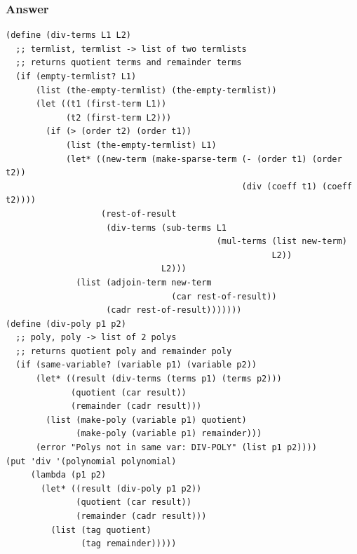 \documentclass[final,fleqn,titlepage,twoside]{article}
\begin{document}
\subsubsection{Answer}
\label{sec:orgd67b558}
\begin{verbatim}
(define (div-terms L1 L2)
  ;; termlist, termlist -> list of two termlists
  ;; returns quotient terms and remainder terms
  (if (empty-termlist? L1)
      (list (the-empty-termlist) (the-empty-termlist))
      (let ((t1 (first-term L1))
            (t2 (first-term L2)))
        (if (> (order t2) (order t1))
            (list (the-empty-termlist) L1)
            (let* ((new-term (make-sparse-term (- (order t1) (order t2))
                                               (div (coeff t1) (coeff t2))))
                   (rest-of-result
                    (div-terms (sub-terms L1
                                          (mul-terms (list new-term)
                                                     L2))
                               L2)))
              (list (adjoin-term new-term
                                 (car rest-of-result))
                    (cadr rest-of-result)))))))
(define (div-poly p1 p2)
  ;; poly, poly -> list of 2 polys
  ;; returns quotient poly and remainder poly
  (if (same-variable? (variable p1) (variable p2))
      (let* ((result (div-terms (terms p1) (terms p2)))
             (quotient (car result))
             (remainder (cadr result)))
        (list (make-poly (variable p1) quotient)
              (make-poly (variable p1) remainder)))
      (error "Polys not in same var: DIV-POLY" (list p1 p2))))
(put 'div '(polynomial polynomial)
     (lambda (p1 p2)
       (let* ((result (div-poly p1 p2))
              (quotient (car result))
              (remainder (cadr result)))
         (list (tag quotient)
               (tag remainder)))))
\end{verbatim}
\end{document}
